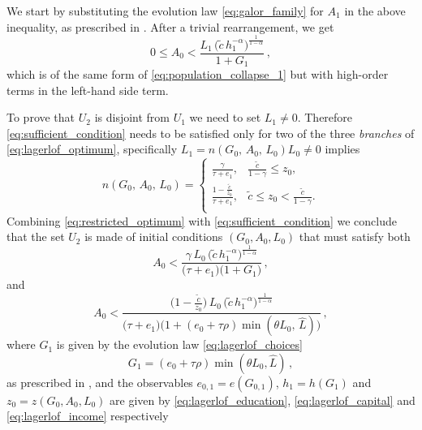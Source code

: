 \documentclass[a4paper,fleqn]{cas-sc}
\begin{document}
We start by substituting the evolution law \eqref{eq:galor_family} for $A_1$ in the above inequality, as prescribed in \cite{Galor2000}.
After a trivial rearrangement, we get
%
\begin{equation}\label{eq:sufficient_condition}
        0\leq A_0<\frac{L_1\,\Big(\tilde{c}\,h_1^{-\alpha}\Big)^{\frac{1}{{1-\alpha}}}}{1 + G_1}\,,
\end{equation}
%
which is of the same form of \eqref{eq:population_collapse_1} but with high-order terms in the left-hand side term.

To prove that $U_2$ is disjoint from $U_1$ we need to set $L_1\neq0$. 
Therefore \eqref{eq:sufficient_condition} needs to be satisfied only for two of the three \emph{branches} of \eqref{eq:lagerlof_optimum}, specifically $L_1=n(G_0,\,A_0,\,L_0)L_0\neq0$ implies
%
\begin{equation}\label{eq:restricted_optimum}
    n(G_0,\,A_0,\,L_0) = 
    \begin{cases}
        \frac{\gamma}{\tau + e_{1}}, & \frac{\tilde c}{1-\gamma} \leq z_0, \\[8pt]
        \frac{1 - \frac{\tilde c}{z_0}}{\tau + e_{1}}, & \tilde c \leq z_0 < \frac{\tilde c}{1-\gamma}. \\[8pt]
    \end{cases}
\end{equation}
%
Combining \eqref{eq:restricted_optimum} with \eqref{eq:sufficient_condition} we conclude that the set $U_2$ is made of initial conditions $(G_0,A_0,L_0)$ that must satisfy both
%
\begin{equation}\label{eq:upper}
    A_0 < \frac{\gamma\,L_0\,\Big(\tilde{c}\,h_1^{-\alpha}\Big)^{\frac{1}{{1-\alpha}}}}{\big(\tau + e_1\big)\big(1 + G_1\big)}\,,
\end{equation}
%
and
\begin{equation}\label{eq:lower}
    A_0 < \frac{\Big(1-\frac{\tilde{c}}{z_0}\Big)\,L_0\,\Big(\tilde{c}\,h_1^{-\alpha}\Big)^{\frac{1}{{1-\alpha}}}}{\big(\tau + e_1\big)\big(1 + (e_0 + \tau\rho)\min(\theta L_0,\,\hat{L})\big)}\,,
\end{equation}
%
where $G_1$ is given by the evolution law \eqref{eq:lagerlof_choices}
\begin{equation}\label{eq:accessory_G1}
    G_1 = (e_0 + \tau\rho)\min(\theta L_0,\hat{L})\,,
\end{equation}
%
as prescribed in \cite{Lagerlof2006}, and the observables $e_{0,1}=e(G_{0,1})$, $h_1=h(G_1)$ and $z_0=z(G_0,A_0,L_0)$ are given by \eqref{eq:lagerlof_education}, \eqref{eq:lagerlof_capital} and \eqref{eq:lagerlof_income} respectively
\end{document}
